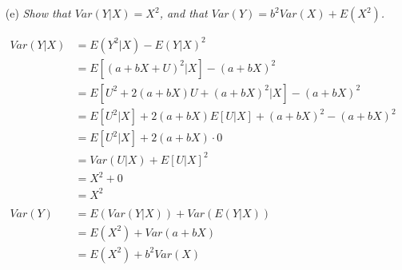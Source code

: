 \documentclass[
]{article}
\begin{document}
\begin{enumerate}
  
\item[(e)] \textit{Show that $Var(Y|X)=X^2$, and that $Var(Y)=b^2 Var(X)+E(X^2)$.}  
  
$$\begin{aligned}
Var(Y|X) &= E(Y^2|X) - E(Y|X)^2 \\
&= E[(a + bX + U)^2|X] - (a + bX)^2 \\
&= E[U^2 + 2(a + bX) U + (a + bX)^2|X] - (a + bX)^2 \\
&= E[U^2|X] + 2(a + bX) E[U|X] + (a + bX)^2 - (a + bX)^2 \\
&= E[U^2|X] + 2(a + bX) \cdot 0 \\
&= Var(U|X) + E[U|X] ^ 2 \\
&= X^2 + 0 \\
&= X^2 \\
\\
Var(Y) &= E(Var(Y|X)) + Var(E(Y|X)) \\
&= E(X^2) + Var(a + bX) \\
&= E(X^2) + b^2Var(X)
\end{aligned}$$


\end{enumerate}
\end{document}
